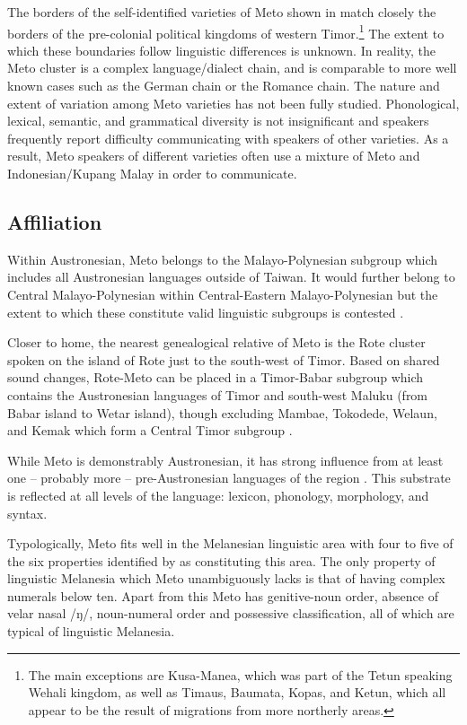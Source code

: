 The borders of the self-identified varieties of Meto shown in 
match closely the borders of the pre-colonial political kingdoms of western Timor.\footnote{
		The main exceptions are Kusa-Manea, which was
		part of the Tetun speaking Wehali kingdom,
		as well as Timaus, Baumata, Kopas, and Ketun, which all
		appear to be the result of migrations from more northerly areas.}
The extent to which these boundaries follow linguistic differences is unknown.
In reality, the Meto cluster is a complex language/dialect chain,
and is comparable to more well known cases such as the German chain or the Romance chain.
The nature and extent of variation among Meto varieties has not been fully studied.
Phonological, lexical, semantic, and grammatical diversity is not insignificant
and speakers frequently report difficulty communicating with speakers of other varieties.
As a result, Meto speakers of different varieties often
use a mixture of Meto and Indonesian/Kupang Malay in order to communicate.

\subsection{Affiliation}
Within Austronesian, Meto belongs to the Malayo-Polynesian subgroup
which includes all Austronesian languages outside of Taiwan.
It would further belong to Central Malayo-Polynesian
within Central-Eastern Malayo-Polynesian
\citep{bl81,bl93,bl09b} but the extent
to which these constitute valid
linguistic subgroups is contested \citep{ro95,ad05,dogr08}.

Closer to home, the nearest genealogical relative of Meto is the Rote cluster
spoken on the island of Rote just to the south-west of Timor.
Based on shared sound changes, Rote-Meto can be placed in a Timor-Babar
subgroup which contains the Austronesian languages of Timor and south-west Maluku
(from Babar island to Wetar island), though excluding
Mambae, Tokodede, Welaun, and Kemak which
form a Central Timor subgroup \citep{ed18d,ed19}.

While Meto is demonstrably Austronesian,
it has strong influence from at least one -- probably more --
pre-Austronesian languages of the region \citep{ed16c,ed18b}.
This substrate is reflected at all levels of the language:
lexicon, phonology, morphology, and syntax.

Typologically, Meto fits well in the Melanesian linguistic area with four to five
of the six properties identified by \cite{sc15} as constituting this area.
The only property of linguistic Melanesia which Meto unambiguously lacks
is that of having complex numerals below ten.
Apart from this Meto has genitive-noun order,
absence of velar nasal /ŋ/, noun-numeral order
and possessive classification,
all of which are typical of linguistic Melanesia.

